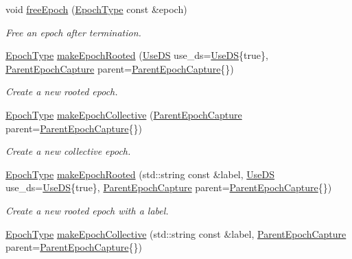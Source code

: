 \begin{DoxyCompactItemize}
void \hyperlink{structvt_1_1term_1_1_termination_detector_a3b1e4a0d87c5af08fc36925ec74504fd}{free\+Epoch} (\hyperlink{namespacevt_a81d11b28122d43bf9834577e4a06440f}{Epoch\+Type} const \&epoch)
\begin{DoxyCompactList}\small\item\em Free an epoch after termination. \end{DoxyCompactList}\item 
\hyperlink{namespacevt_a81d11b28122d43bf9834577e4a06440f}{Epoch\+Type} \hyperlink{structvt_1_1term_1_1_termination_detector_a232f305124ecd8f4f62e9c8224a74f49}{make\+Epoch\+Rooted} (\hyperlink{structvt_1_1term_1_1_use_d_s}{Use\+DS} use\+\_\+ds=\hyperlink{structvt_1_1term_1_1_use_d_s}{Use\+DS}\{true\}, \hyperlink{structvt_1_1term_1_1_parent_epoch_capture}{Parent\+Epoch\+Capture} parent=\hyperlink{structvt_1_1term_1_1_parent_epoch_capture}{Parent\+Epoch\+Capture}\{\})
\begin{DoxyCompactList}\small\item\em Create a new rooted epoch. \end{DoxyCompactList}\item 
\hyperlink{namespacevt_a81d11b28122d43bf9834577e4a06440f}{Epoch\+Type} \hyperlink{structvt_1_1term_1_1_termination_detector_aeba62165ec8dfbc445e3631ff295f159}{make\+Epoch\+Collective} (\hyperlink{structvt_1_1term_1_1_parent_epoch_capture}{Parent\+Epoch\+Capture} parent=\hyperlink{structvt_1_1term_1_1_parent_epoch_capture}{Parent\+Epoch\+Capture}\{\})
\begin{DoxyCompactList}\small\item\em Create a new collective epoch. \end{DoxyCompactList}\item 
\hyperlink{namespacevt_a81d11b28122d43bf9834577e4a06440f}{Epoch\+Type} \hyperlink{structvt_1_1term_1_1_termination_detector_aa9298125af35069455ca2edfdd2a2426}{make\+Epoch\+Rooted} (std\+::string const \&label, \hyperlink{structvt_1_1term_1_1_use_d_s}{Use\+DS} use\+\_\+ds=\hyperlink{structvt_1_1term_1_1_use_d_s}{Use\+DS}\{true\}, \hyperlink{structvt_1_1term_1_1_parent_epoch_capture}{Parent\+Epoch\+Capture} parent=\hyperlink{structvt_1_1term_1_1_parent_epoch_capture}{Parent\+Epoch\+Capture}\{\})
\begin{DoxyCompactList}\small\item\em Create a new rooted epoch with a label. \end{DoxyCompactList}\item 
\hyperlink{namespacevt_a81d11b28122d43bf9834577e4a06440f}{Epoch\+Type} \hyperlink{structvt_1_1term_1_1_termination_detector_a9da0ae37a148a0f6db83488cd44c19cb}{make\+Epoch\+Collective} (std\+::string const \&label, \hyperlink{structvt_1_1term_1_1_parent_epoch_capture}{Parent\+Epoch\+Capture} parent=\hyperlink{structvt_1_1term_1_1_parent_epoch_capture}{Parent\+Epoch\+Capture}\{\})

\end{DoxyCompactItemize}
